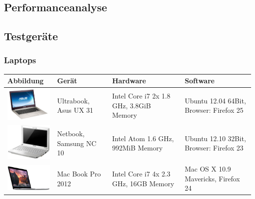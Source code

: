 \begin{landscape}

\chapter{Performanceanalyse}
	\label{performanceanalyse} 
	
	
	\section{Testgeräte}
	
		\subsection{Laptops}
		\begin{tabularx}{1.4\textwidth}{|l|XXX|}
			\hline
			\textbf{Abbildung} & \textbf{Gerät} & \textbf{Hardware} & \textbf{Software}\\
			\hline
			\includegraphics[width=3cm]{../performanceAnalaysis/devices/asusux21.png} & Ultrabook, Asus UX 31 & Intel Core i7 2x 1.8 GHz, 3.8GiB Memory
	& Ubuntu 12.04 64Bit, Browser: Firefox 25 \\
			\hline
			\includegraphics[width=3cm]{../performanceAnalaysis/devices/samsungnc10.jpg} & Netbook, Samsung NC 10 & Intel Atom 1.6 GHz, 992MiB Memory & Ubuntu 12.10 32Bit, Browser: Firefox 23 \\
			\hline
			\includegraphics[width=3cm]{../performanceAnalaysis/devices/macbookpro.jpg} & Mac Book Pro 2012 & Intel Core i7 4x 2.3 GHz, 16GB Memory & Mac OS X 10.9 Mavericks, Firefox 24 \\
			\hline
		\end{tabularx}
		

\end{landscape}
